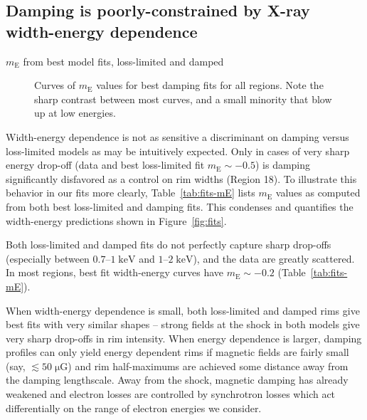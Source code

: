 \documentclass[iop, apj, numberedappendix]{emulateapj}
\newcommand*{\mt}{\mathrm}
\newcommand*{\unit}[1]{\;\mt{#1}}  %
\newcommand*{\mE}{m_\mt{E}}
\newcommand*{\muG}{\unit{\mu G}}
\begin{document}
\subsection{Damping is poorly-constrained by X-ray width-energy dependence}

\begin{table*}[ht]
    \scriptsize
    \centering
    \caption{$m_\mt{E}$ from best model fits, loss-limited and damped
        \label{tab:fits-mE}}
    
\end{table*}


\begin{figure}
    \centering
    \iftoggle{manuscript}{
        \texttt{[image: figures/full-std\_err-mE-damp-all.pdf]}
        \texttt{[image: figures/full-std\_err-mE-damp-log.pdf]}
    }{
        \plotone{figures/full-std_err-mE-damp-all.pdf}
        \plotone{figures/full-std_err-mE-damp-log.pdf}
    }
    \caption{Curves of $\mE$ values for best damping fits for all regions.
        Note the sharp contrast between most curves, and a small minority that
        blow up at low energies.
    \label{fig:mE}}
\end{figure}


Width-energy dependence is not as sensitive a discriminant on damping versus
loss-limited models as may be intuitively expected.  Only in cases of very
sharp energy drop-off (data and best loss-limited fit $\mE \sim -0.5$) is
damping significantly disfavored as a control on rim widths (Region 18).  To
illustrate this behavior in our fits more clearly, Table~\ref{tab:fits-mE}
lists $\mE$ values as computed from both best loss-limited and damping fits.
This condenses and quantifies the width-energy predictions shown in
Figure~\ref{fig:fits}.

Both loss-limited and damped fits do not perfectly capture sharp drop-offs
(especially between $0.7$--$1 \unit{keV}$ and $1$--$2 \unit{keV}$), and the
data are greatly scattered.  In most regions, best fit width-energy curves have
$\mE \sim -0.2$ (Table~\ref{tab:fits-mE}).

When width-energy dependence is small, both loss-limited and damped rims give
best fits with very similar shapes -- strong fields at the shock in both models
give very sharp drop-offs in rim intensity.  When energy dependence is larger,
damping profiles can only yield energy dependent rims if magnetic fields are
fairly small (say, $\lesssim 50 \muG$) and rim half-maximums are achieved some
distance away from the damping lengthscale.  Away from the shock, magnetic
damping has already weakened and electron losses are controlled by synchrotron
losses which act differentially on the range of electron energies we consider.
\end{document}

